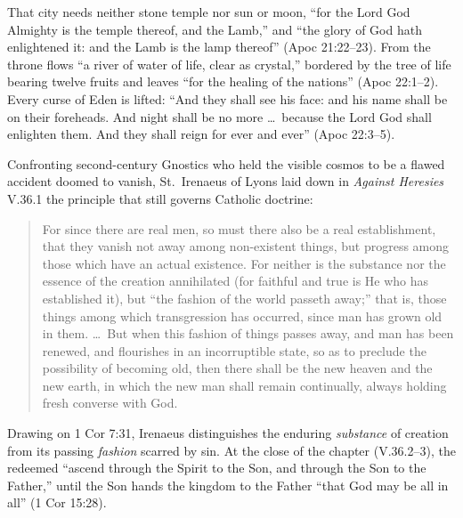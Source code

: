 That city needs neither stone temple nor sun or moon, ``for the Lord God Almighty is the temple thereof, and the Lamb,'' and ``the glory of God hath enlightened it: and the Lamb is the lamp thereof'' (Apoc 21:22--23). From the throne flows ``a river of water of life, clear as crystal,'' bordered by the tree of life bearing twelve fruits and leaves ``for the healing of the nations'' (Apoc 22:1--2). Every curse of Eden is lifted: ``And they shall see his face: and his name shall be on their foreheads. And night shall be no more \dots\ because the Lord God shall enlighten them. And they shall reign for ever and ever'' (Apoc 22:3--5).

Confronting second-century Gnostics who held the visible cosmos to be a flawed accident doomed to vanish, St.\ Irenaeus of Lyons laid down in \textit{Against Heresies} V.36.1 the principle that still governs Catholic doctrine:

\begin{quote}
For since there are real men, so must there also be a real establishment, that they vanish not away among non-existent things, but progress among those which have an actual existence. For neither is the substance nor the essence of the creation annihilated (for faithful and true is He who has established it), but ``the fashion of the world passeth away;'' that is, those things among which transgression has occurred, since man has grown old in them. \dots\ But when this fashion of things passes away, and man has been renewed, and flourishes in an incorruptible state, so as to preclude the possibility of becoming old, then there shall be the new heaven and the new earth, in which the new man shall remain continually, always holding fresh converse with God.
\end{quote}

Drawing on 1 Cor 7:31, Irenaeus distinguishes the enduring \textit{substance} of creation from its passing \textit{fashion} scarred by sin. At the close of the chapter (V.36.2--3), the redeemed ``ascend through the Spirit to the Son, and through the Son to the Father,'' until the Son hands the kingdom to the Father ``that God may be all in all'' (1 Cor 15:28).

